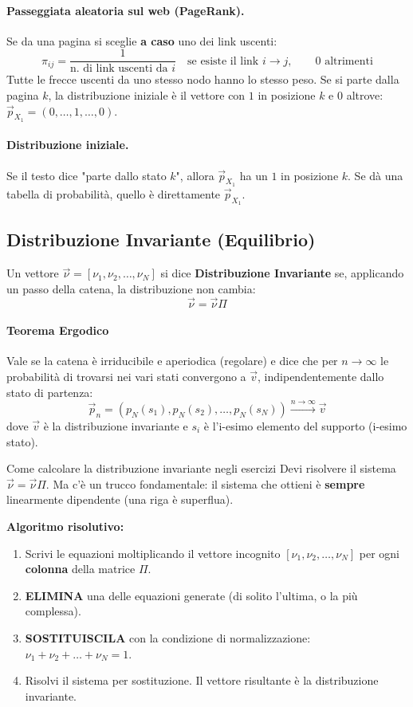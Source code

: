 \documentclass[12pt]{extarticle} %
\begin{document}
\paragraph{Passeggiata aleatoria sul web (PageRank).} Se da una pagina si sceglie \textbf{a caso} uno dei link uscenti:
$$ \pi_{ij} = \frac{1}{\text{n. di link uscenti da } i} \quad \text{se esiste il link } i \to j, \qquad 0 \text{ altrimenti} $$
{\footnotesize Tutte le frecce uscenti da uno stesso nodo hanno lo stesso peso. Se si parte dalla pagina $k$, la distribuzione iniziale è il vettore con $1$ in posizione $k$ e $0$ altrove: $\vec{p}_{X_1} = (0,\dots,1,\dots,0)$.}

\paragraph{Distribuzione iniziale.} Se il testo dice "parte dallo stato $k$", allora $\vec{p}_{X_1}$ ha un $1$ in posizione $k$. Se dà una tabella di probabilità, quello è direttamente $\vec{p}_{X_1}$.

\subsection{Distribuzione Invariante (Equilibrio)}
Un vettore $\vec{\nu} = [\nu_1, \nu_2, \dots, \nu_N]$ si dice \textbf{Distribuzione Invariante} se, applicando un passo della catena, la distribuzione non cambia:
$$ \vec{\nu} = \vec{\nu} \Pi $$

\paragraph{Teorema Ergodico} Vale se la catena è irriducibile e aperiodica (regolare) e dice che per $n\to\infty$ le probabilità di trovarsi nei vari stati convergono a $\vec{v}$, indipendentemente dallo stato di partenza:
$$
\vec{p}_n = (p_N (s_1), p_N (s_2), \dots, p_N (s_N)) \xrightarrow{n\to\infty} \vec{v}
$$
dove $\vec{v}$ è la distribuzione invariante e $s_i$ è l'i-esimo elemento del supporto (i-esimo stato).

\begin{eserciziobox}{Come calcolare la distribuzione invariante negli esercizi}
Devi risolvere il sistema $\vec{\nu} = \vec{\nu} \Pi$. Ma c'è un trucco fondamentale: il sistema che ottieni è \textbf{sempre} linearmente dipendente (una riga è superflua). 

\textbf{Algoritmo risolutivo:}
\begin{enumerate}
    \item Scrivi le equazioni moltiplicando il vettore incognito $[\nu_1, \nu_2, \dots, \nu_N]$ per ogni \textbf{colonna} della matrice $\Pi$.
    \item \textbf{ELIMINA} una delle equazioni generate (di solito l'ultima, o la più complessa).
    \item \textbf{SOSTITUISCILA} con la condizione di normalizzazione: $\nu_1 + \nu_2 + \dots + \nu_N = 1$.
    \item Risolvi il sistema per sostituzione. Il vettore risultante è la distribuzione invariante.
\end{enumerate}
\end{eserciziobox}
\end{document}
